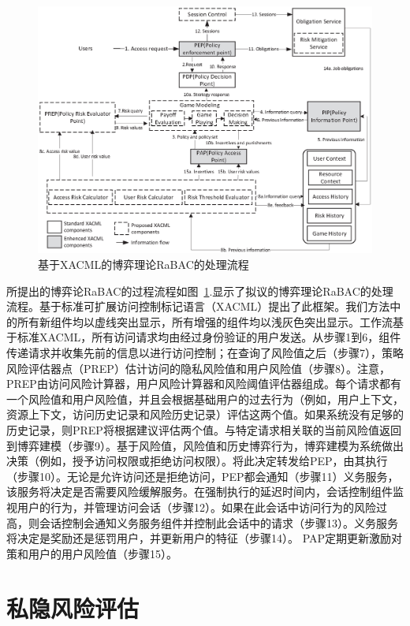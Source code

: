 \begin{figure}[htb]
	\centering
	\includegraphics[width=1\textwidth]{./figures/game-rbac-workflow.eps}
	\caption{基于XACML的博弈理论RaBAC的处理流程}\label{fig:game-rbac-workflow}
\end{figure}


所提出的博弈论RaBAC的过程流程如图~\ref{fig:game-rbac-workflow}.显示了拟议的博弈理论RaBAC的处理流程。基于标准可扩展访问控制标记语言（XACML）提出了此框架。我们方法中的所有新组件均以虚线突出显示，所有增强的组件均以浅灰色突出显示。工作流基于标准XACML，所有访问请求均由经过身份验证的用户发送。从步骤1到6，组件传递请求并收集先前的信息以进行访问控制；在查询了风险值之后（步骤7），策略风险评估器点（PREP）估计访问的隐私风险值和用户风险值（步骤8）。注意，PREP由访问风险计算器，用户风险计算器和风险阈值评估器组成。每个请求都有一个风险值和用户风险值，并且会根据基础用户的过去行为（例如，用户上下文，资源上下文，访问历史记录和风险历史记录）评估这两个值。如果系统没有足够的历史记录，则PREP将根据建议评估两个值。与特定请求相关联的当前风险值返回到博弈建模（步骤9）。基于风险值，风险值和历史博弈行为，博弈建模为系统做出决策（例如，授予访问权限或拒绝访问权限）。将此决定转发给PEP，由其执行（步骤10）。无论是允许访问还是拒绝访问，PEP都会通知（步骤11）义务服务，该服务将决定是否需要风险缓解服务。在强制执行的延迟时间内，会话控制组件监视用户的行为，并管理访问会话（步骤12）。如果在此会话中访问行为的风险过高，则会话控制会通知义务服务组件并控制此会话中的请求（步骤13）。义务服务将决定是奖励还是惩罚用户，并更新用户的特征（步骤14）。 PAP定期更新激励对策和用户的用户风险值（步骤15）。

\section{私隐风险评估}
\label{sec:riskvalue}

